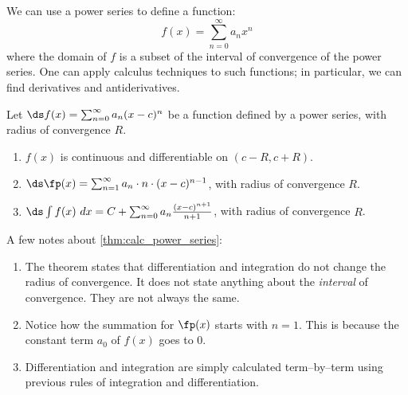 We can use a power series to define a function:
$$f(x) = \sum_{n=0}^\infty a_nx^n$$
where the domain of $f$ is a subset of the interval of convergence of the power series. One can apply calculus techniques to such functions; in particular, we can find derivatives and antiderivatives. 

{Let $\ds f(x) = \sum_{n=0}^\infty a_n(x-c)^n$ be a function defined by a power series, with radius of convergence $R$.
\begin{enumerate}
	\item $f(x)$ is continuous and differentiable on $(c-R,c+R)$.
	\item	$\ds \fp(x) = \sum_{n=1}^\infty a_n\cdot n\cdot (x-c)^{n-1}$, with radius of convergence $R$.
	\item	$\ds \int f(x)\ dx = C+\sum_{n=0}^\infty a_n\frac{(x-c)^{n+1}}{n+1}$, with radius of convergence $R$.
\end{enumerate}}

A few notes about \autoref{thm:calc_power_series}:
\begin{enumerate}
	\item The theorem states that differentiation and integration do not change the radius of convergence. It does not state anything about the \emph{interval} of convergence. They are not always the same.
	\item	Notice how the summation for $\fp(x)$ starts with $n=1$. This is because the constant term $a_0$ of $f(x)$ goes to 0.
	\item	Differentiation and integration are simply calculated term--by--term using previous rules of integration and differentiation.
\end{enumerate}

